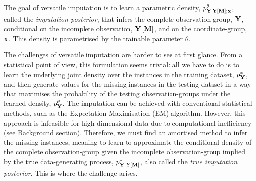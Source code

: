 \documentclass[../thesis.tex]{subfiles}
\begin{document}
The goal of versatile imputation is to learn a parametric density, $\myfunc{p}^{\theta}_{\mygroup{\myrv{y}} | \mygroup{\myrv{y}} \left[ \mygroup{\myrv{m}} \right]; \mygroup{\myvect{x}}}$, called the \textit{imputation posterior}, that infers the complete observation-group, $\mygroup{\myrv{y}}$, conditional on the incomplete observation, $\mygroup{\myrv{y}} \left[ \mygroup{\myrv{m}} \right]$, and on the coordinate-group, $\mathbf{{x}}$. This density is parametrised by the trainable parameter $\theta$.



The challenges of versatile imputation are harder to see at first glance. From a statistical point of view, this formulation seems trivial: all we have to do is to learn the underlying joint density over the instances in the training dataset, $\myfunc{p}^{*}_{\mygroup{\myrv{y}}}$, and then generate values for the missing instances in the testing dataset in a way that maximises the probability of the testing observation-groups under the learned density, $\myfunc{p}^{\theta}_{\mygroup{\myrv{y}}}$. The imputation can be achieved with conventional statistical methods, such as the Expectation Maximisation (EM) algorithm. However, this approach is infeasible for high-dimensional data due to computational inefficiency (see Background section). Therefore, we must find an amortised method to infer the missing instances, meaning to learn to approximate the conditional density of the complete observation-group given the incomplete observation-group implied by the true data-generating process, $\myfunc{p}^{*}_{\mygroup{\myrv{y}} | \mygroup{\myrv{y}} \left[ \mygroup{\myrv{m}} \right]}$, also called the \textit{true imputation posterior}. This is where the challenge arises. 
\end{document}
